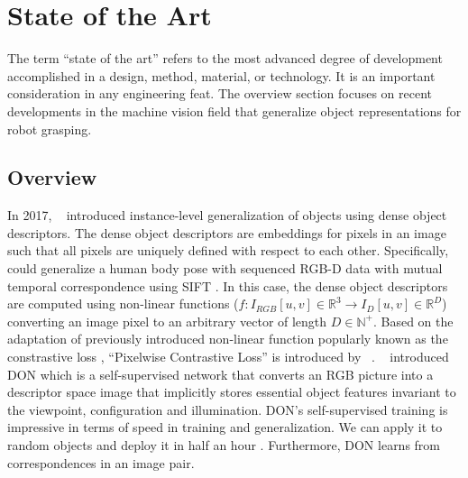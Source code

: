 \chapter{State of the Art}

The term ``state of the art'' refers to the most advanced degree of development accomplished in a design, method, material, or technology. It is an important consideration in any engineering feat.
The overview section focuses on recent developments in the machine vision field that generalize object representations for robot grasping.

\section{Overview}

In 2017, \citeauthor{schmidt2016self}~\cite{schmidt2016self} introduced instance-level generalization of objects using dense object descriptors.
The dense object descriptors are embeddings for pixels in an image such that all pixels are uniquely defined with respect to each other.
Specifically, \citeauthor{schmidt2016self}~\cite{schmidt2016self} could generalize a human body pose with sequenced
RGB-D data with mutual temporal correspondence using \ac{SIFT} \cite{sift}. In this case, the dense object
descriptors are computed using non-linear functions ($f: I_{RGB}[u,v] \in \mathbb{R}^3 \rightarrow I_D[u, v] \in \mathbb{R}^D$)
converting an image pixel to an arbitrary vector of length $D \in \mathbb{N}^+$.
Based on the adaptation of previously introduced non-linear function popularly known as the constrastive loss \cite{zhao2021contrastive}, ``Pixelwise Contrastive Loss'' is introduced by \citeauthor{florence2018dense}~\cite{florence2018dense}. \citeauthor{florence2018dense}~\cite{florence2018dense} introduced \ac{DON}
which is a self-supervised network that converts an \ac{RGB} picture into a descriptor space image that implicitly stores essential object features invariant to the viewpoint, configuration and
illumination. \ac{DON}'s self-supervised training is impressive in terms of speed in training and generalization. We can apply it to random objects
and deploy it in half an hour \cite{florence2018dense}. Furthermore, \ac{DON} learns from correspondences in an image pair.\\


